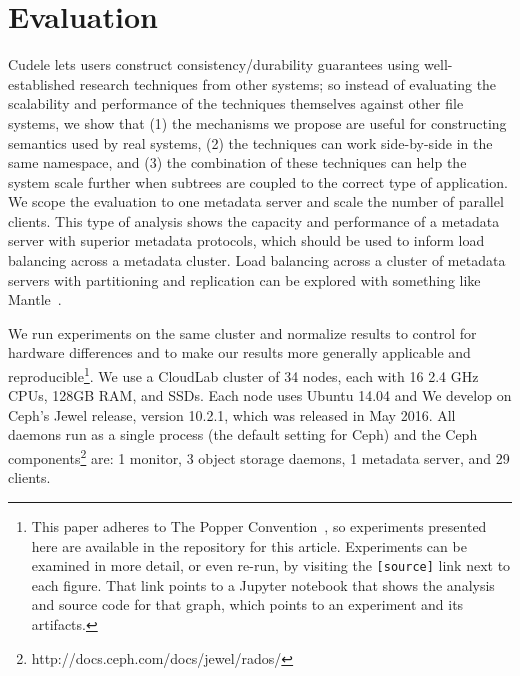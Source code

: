 \section{Evaluation}
\label{sec:evaluation}

Cudele lets users construct consistency/durability guarantees using
well-established research techniques from other systems; so instead of
evaluating the scalability and performance of the techniques themselves against
other file systems, we show that (1) the mechanisms we propose are useful for
constructing semantics used by real systems, (2) the techniques can work
side-by-side in the same namespace, and (3) the combination of these techniques
can help the system scale further when subtrees are coupled to the correct type
of application.  We scope the evaluation to one metadata server and scale the
number of parallel clients. This type of analysis shows the capacity and
performance of a metadata server with superior metadata protocols, which should
be used to inform load balancing across a metadata cluster. Load balancing
across a cluster of metadata servers with partitioning and replication can be
explored with something like Mantle~\cite{sevilla:sc15-mantle}.


We run experiments on the same cluster and normalize results to control for
hardware differences and to make our results more generally applicable and
reproducible\footnote{ This paper adheres to The Popper
Convention~\cite{jimenez_popper_2016}, so experiments presented here are
available in the repository for this article.  Experiments can be examined in
more detail, or even re-run, by visiting the \texttt{[source]} link next to
each figure. That link points to a Jupyter notebook that shows the analysis and
source code for that graph, which points to an experiment and its artifacts.}.
We use a CloudLab cluster of 34 nodes, each with 16 2.4 GHz CPUs, 128GB RAM,
and SSDs.  Each node uses Ubuntu 14.04 and We develop on Ceph's Jewel release,
version 10.2.1, which was released in May 2016. All daemons run as a single
process (the default setting for Ceph) and the Ceph
components\footnote{http://docs.ceph.com/docs/jewel/rados/} are: 1 monitor, 3
object storage daemons, 1 metadata server, and 29 clients.

